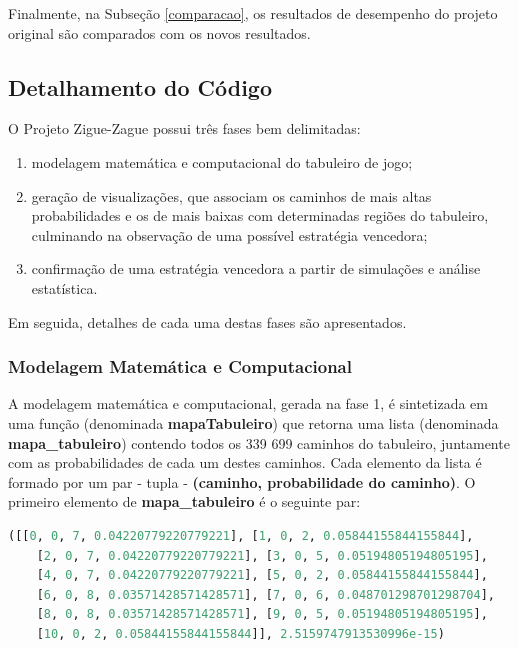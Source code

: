 \documentclass[12pt]{article}
\begin{document}
Finalmente, na Subseção \ref{comparacao}, os resultados de desempenho do projeto original são comparados com os novos resultados.

\subsection{Detalhamento do Código}
\label{detalhamento}

O Projeto Zigue-Zague possui três fases bem delimitadas: 

\begin{enumerate}
	\item modelagem matemática e computacional do tabuleiro de jogo; 
	\item geração de visualizações, que associam os caminhos de mais altas probabilidades e os de mais baixas com determinadas regiões do tabuleiro, culminando na observação de uma possível estratégia vencedora; 
	\item confirmação de uma estratégia vencedora a partir de simulações e análise estatística.
\end{enumerate} 

Em seguida, detalhes de cada uma destas fases são apresentados.

\subsubsection{Modelagem Matemática e Computacional}
\label{modelagem}

A modelagem matemática e computacional, gerada na fase 1, é sintetizada em uma função (denominada \textbf{mapaTabuleiro}) que retorna uma lista (denominada \textbf{mapa\_tabuleiro}) contendo todos os 339 699 caminhos do tabuleiro, juntamente com as probabilidades de cada um destes caminhos. Cada elemento da lista é formado por um par - tupla - \textbf{(caminho, probabilidade do caminho)}. O primeiro elemento de \textbf{mapa\_tabuleiro} é o seguinte par:

\begin{lstlisting}[language=Python]
([[0, 0, 7, 0.04220779220779221], [1, 0, 2, 0.05844155844155844], 
	[2, 0, 7, 0.04220779220779221], [3, 0, 5, 0.05194805194805195],
	[4, 0, 7, 0.04220779220779221], [5, 0, 2, 0.05844155844155844], 
	[6, 0, 8, 0.03571428571428571], [7, 0, 6, 0.048701298701298704], 
	[8, 0, 8, 0.03571428571428571], [9, 0, 5, 0.05194805194805195], 
	[10, 0, 2, 0.05844155844155844]], 2.5159747913530996e-15)
\end{lstlisting}
\end{document}
